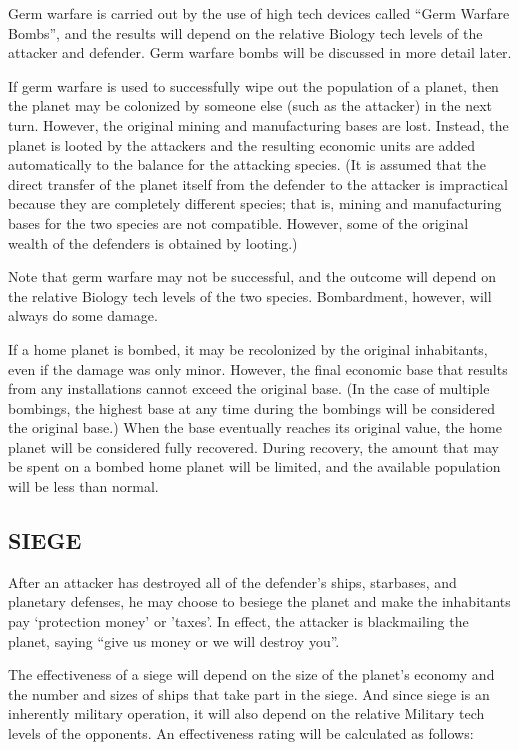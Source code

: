 \documentclass[10pt,titlepage]{article}
\begin{document}
Germ warfare is carried out by the use of high tech devices called ``Germ
Warfare Bombs'', and the results will depend on the relative Biology tech levels
of the attacker and defender.  Germ warfare bombs will be discussed in more
detail later.

If germ warfare is used to successfully wipe out the population of a planet,
then the planet may be colonized by someone else (such as the attacker) in
the next turn.  However, the original mining and manufacturing bases are lost.
Instead, the planet is looted by the attackers and the resulting economic units
are added automatically to the balance for the attacking species.  (It is
assumed that the direct transfer of the planet itself from the defender to the
attacker is impractical because they are completely different species; that
is, mining and manufacturing bases for the two species are not compatible.
However, some of the original wealth of the defenders is obtained by looting.)

Note that germ warfare may not be successful, and the outcome will depend on
the relative Biology tech levels of the two species.  Bombardment, however,
will always do some damage.

If a home planet is bombed, it may be recolonized by the original inhabitants,
even if the damage was only minor.  However, the final economic base that
results from any installations cannot exceed the original base.  (In the case
of multiple bombings, the highest base at any time during the bombings will be
considered the original base.)  When the base eventually reaches its original
value, the home planet will be considered fully recovered.  During recovery,
the amount that may be spent on a bombed home planet will be limited, and the
available population will be less than normal.


\subsection{SIEGE}
\label{sec:siege}


After an attacker has destroyed all of the defender's ships, starbases,
and planetary defenses, he may choose to besiege the planet and make the
inhabitants pay `protection money' or 'taxes'.  In effect, the attacker is
blackmailing the planet, saying ``give us money or we will destroy you''.

The effectiveness of a siege will depend on the size of the planet's economy
and the number and sizes of ships that take part in the siege.  And since siege
is an inherently military operation, it will also depend on the relative
Military tech levels of the opponents.  An effectiveness rating will be
calculated as follows:
\end{document}
